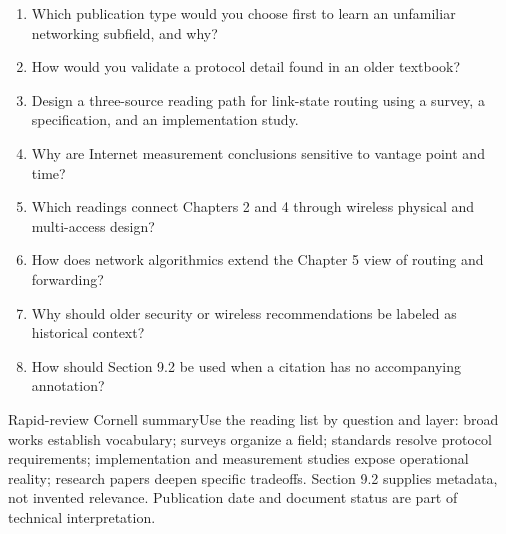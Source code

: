 \documentclass[10pt,letterpaper]{article}
\begin{document}
\begin{enumerate}
  \item Which publication type would you choose first to learn an unfamiliar networking subfield, and why?
  \item How would you validate a protocol detail found in an older textbook?
  \item Design a three-source reading path for link-state routing using a survey, a specification, and an implementation study.
  \item Why are Internet measurement conclusions sensitive to vantage point and time?
  \item Which readings connect Chapters 2 and 4 through wireless physical and multi-access design?
  \item How does network algorithmics extend the Chapter 5 view of routing and forwarding?
  \item Why should older security or wireless recommendations be labeled as historical context?
  \item How should Section 9.2 be used when a citation has no accompanying annotation?
\end{enumerate}
\begin{CornellSummaryBox}{Rapid-review Cornell summary}Use the reading list by question and layer: broad works establish vocabulary; surveys organize a field; standards resolve protocol requirements; implementation and measurement studies expose operational reality; research papers deepen specific tradeoffs. Section 9.2 supplies metadata, not invented relevance. Publication date and document status are part of technical interpretation.\end{CornellSummaryBox}
\end{document}
